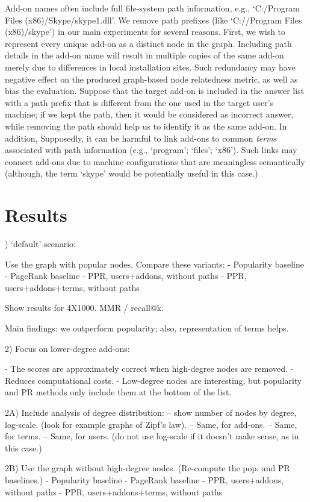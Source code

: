\documentclass[11pt,oneside]{book}
\let\Oldsection\section
\renewcommand{\section}{\FloatBarrier\Oldsection}
\begin{document}
Add-on names often include full file-system path information, e.g., 
`C:/Program Files (x86)/Skype/skype1.dll'. We remove path prefixes (like `C://Program Files (x86)/skype') in our main experiments for several reasons. First, we wish to represent every unique add-on as a distinct node in the graph. Including path details in the add-on name will result in multiple copies of the same add-on merely due to differences in local installation sites. Such redundancy may have negative effect on the produced  graph-based node relatedness metric, as well as bias the evaluation. 
Suppose that the target add-on is included in the answer list with a path prefix that is different from the one used in the target user's machine; if we kept the path, then it would be considered as incorrect answer, while removing the path should help us to identify it as the same add-on. In addition, Supposedly, it can be harmful to link add-ons to common {\it terms} associated with path information (e.g., `program'; `files'; `x86'). Such links may connect add-ons due to machine configurations that are meaningless semantically (although, the term `skype' would be potentially useful in this case.)


\section{Results}
\label{sec:user_main_results}

) `default' scenario:

Use the graph with popular nodes. Compare these variants:
- Popularity baseline
- PageRank baseline
- PPR, users+addons, without paths
- PPR, users+addons+terms, without paths

Show results for 4X1000. MMR / recall@k.

Main findings: we outperform popularity; also, representation of terms helps.

2) Focus on lower-degree add-ons:

- The scores are approximately correct when high-degree nodes are removed.
- Reduces computational costs.
- Low-degree nodes are interesting, but popularity and PR methods only include them at the bottom of the list.

2A) Include analysis of degree distribution: 
-- show number of nodes by degree, log-scale. (look for example graphs of Zipf's law).
-- Same, for add-ons.
-- Same, for terms.
-- Same, for users. (do not use log-scale if it doesn't make sense, as in this case.)

2B) Use the graph without high-degree nodes. (Re-compute the pop. and PR baselines.)
- Popularity baseline
- PageRank baseline
- PPR, users+addons, without paths
- PPR, users+addons+terms, without paths
\end{document}
